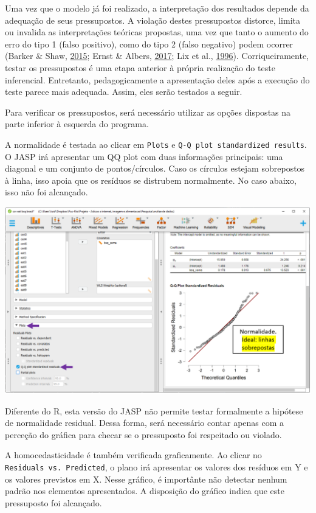 \documentclass[
]{book}
\begin{document}
Uma vez que o modelo já foi realizado, a interpretação dos resultados
depende da adequação de seus pressupostos. A violação destes
pressupostos distorce, limita ou invalida as interpretações teóricas
propostas, uma vez que tanto o aumento do erro do tipo 1 (falso
positivo), como do tipo 2 (falso negativo) podem ocorrer (Barker \&
Shaw, \protect\hyperlink{ref-Barker2015}{2015}; Ernst \& Albers,
\protect\hyperlink{ref-Ernst2017}{2017}; Lix et al.,
\protect\hyperlink{ref-Lix1996}{1996}). Corriqueiramente, testar os
pressupostos é uma etapa anterior à própria realização do teste
inferencial. Entretanto, pedagogicamente a apresentação deles após a
execução do teste parece mais adequada. Assim, eles serão testados a
seguir.

Para verificar os pressupostos, será necessário utilizar as opções
dispostas na parte inferior à esquerda do programa.

A normalidade é testada ao clicar em \texttt{Plots} e
\texttt{Q-Q\ plot\ standardized\ results}. O JASP irá apresentar um QQ
plot com duas informações principais: uma diagonal e um conjunto de
pontos/círculos. Caso os círculos estejam sobrepostos à linha, isso
apoia que os resíduos se distrubem normalmente. No caso abaixo, isso não
foi alcançado.

\includegraphics{./img/cap_reg_normalidade.png}

Diferente do R, esta versão do JASP não permite testar formalmente a
hipótese de normalidade residual. Dessa forma, será necessário contar
apenas com a perceção do gráfica para checar se o pressuposto foi
respeitado ou violado.

A homocedasticidade é também verificada graficamente. Ao clicar no
\texttt{Residuals\ vs.\ Predicted}, o plano irá apresentar os valores
dos resíduos em Y e os valores previstos em X. Nesse gráfico, é
importânte não detectar nenhum padrão nos elementos apresentados. A
disposição do gráfico indica que este pressuposto foi alcançado.
\end{document}
